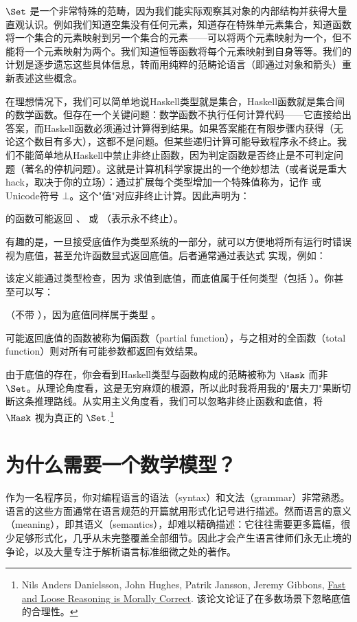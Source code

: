$\Set$ 是一个非常特殊的范畴，因为我们能实际观察其对象的内部结构并获得大量直观认识。例如我们知道空集没有任何元素，知道存在特殊单元素集合，知道函数将一个集合的元素映射到另一个集合的元素——可以将两个元素映射为一个，但不能将一个元素映射为两个。我们知道恒等函数将每个元素映射到自身等等。我们的计划是逐步遗忘这些具体信息，转而用纯粹的范畴论语言（即通过对象和箭头）重新表述这些概念。

在理想情况下，我们可以简单地说Haskell类型就是集合，Haskell函数就是集合间的数学函数。但存在一个关键问题：数学函数不执行任何计算代码——它直接给出答案，而Haskell函数必须通过计算得到结果。如果答案能在有限步骤内获得（无论这个数目有多大），这都不是问题。但某些递归计算可能导致程序永不终止。我们不能简单地从Haskell中禁止非终止函数，因为判定函数是否终止是不可判定问题（著名的停机问题）。这就是计算机科学家提出的一个绝妙想法（或者说是重大hack，取决于你的立场）：通过扩展每个类型增加一个特殊值称为，记作 \code{\_|\_} 或Unicode符号 $\bot$。这个"值"对应非终止计算。因此声明为：

的函数可能返回 、 或 \code{\_|\_}（表示永不终止）。

有趣的是，一旦接受底值作为类型系统的一部分，就可以方便地将所有运行时错误视为底值，甚至允许函数显式返回底值。后者通常通过表达式  实现，例如：

该定义能通过类型检查，因为  求值到底值，而底值属于任何类型（包括 ）。你甚至可以写：

（不带 ），因为底值同样属于类型 。

可能返回底值的函数被称为偏函数（partial function），与之相对的全函数（total function）则对所有可能参数都返回有效结果。

由于底值的存在，你会看到Haskell类型与函数构成的范畴被称为 $\Hask$ 而非 $\Set$。从理论角度看，这是无穷麻烦的根源，所以此时我将用我的"屠夫刀"果断切断这条推理路线。从实用主义角度看，我们可以忽略非终止函数和底值，将 $\Hask$ 视为真正的 $\Set$.\footnote{Nils Anders Danielsson, John Hughes, Patrik Jansson, Jeremy Gibbons, \href{http://www.cs.ox.ac.uk/jeremy.gibbons/publications/fast+loose.pdf}{Fast and Loose Reasoning is Morally Correct}. 该论文论证了在多数场景下忽略底值的合理性。}

\section{为什么需要一个数学模型？}

作为一名程序员，你对编程语言的语法（syntax）和文法（grammar）非常熟悉。语言的这些方面通常在语言规范的开篇就用形式化记号进行描述。然而语言的意义（meaning），即其语义（semantics），却难以精确描述：它往往需要更多篇幅，很少足够形式化，几乎从未完整覆盖全部细节。因此才会产生语言律师们永无止境的争论，以及大量专注于解析语言标准细微之处的著作。

